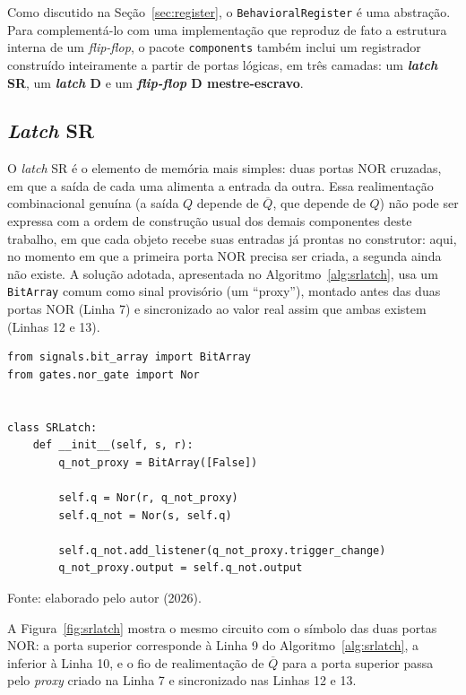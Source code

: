 Como discutido na Seção~\ref{sec:register}, o \texttt{BehavioralRegister} é uma abstração. Para complementá-lo com uma implementação que reproduz de fato a estrutura interna de um \textit{flip-flop}, o pacote \texttt{components} também inclui um registrador construído inteiramente a partir de portas lógicas, em três camadas: um \textbf{\textit{latch} SR}, um \textbf{\textit{latch} D} e um \textbf{\textit{flip-flop} D mestre-escravo}.

\subsection{\textit{Latch} SR}

O \textit{latch} SR é o elemento de memória mais simples: duas portas NOR cruzadas, em que a saída de cada uma alimenta a entrada da outra. Essa realimentação combinacional genuína (a saída $Q$ depende de $\overline{Q}$, que depende de $Q$) não pode ser expressa com a ordem de construção usual dos demais componentes deste trabalho, em que cada objeto recebe suas entradas já prontas no construtor: aqui, no momento em que a primeira porta NOR precisa ser criada, a segunda ainda não existe. A solução adotada, apresentada no Algoritmo~\ref{alg:srlatch}, usa um \texttt{BitArray} comum como sinal provisório (um ``proxy''), montado antes das duas portas NOR (Linha 7) e sincronizado ao valor real assim que ambas existem (Linhas 12 e 13).

\begin{algoritmo}[H]
\caption{SRLatch (components/sr\_latch.py).}
\label{alg:srlatch}
\begin{verbatim}
from signals.bit_array import BitArray
from gates.nor_gate import Nor


class SRLatch:
    def __init__(self, s, r):
        q_not_proxy = BitArray([False])

        self.q = Nor(r, q_not_proxy)
        self.q_not = Nor(s, self.q)

        self.q_not.add_listener(q_not_proxy.trigger_change)
        q_not_proxy.output = self.q_not.output
\end{verbatim}
\begin{center}
\footnotesize Fonte: elaborado pelo autor (2026).
\end{center}
\end{algoritmo}

A Figura~\ref{fig:srlatch} mostra o mesmo circuito com o símbolo das duas portas NOR: a porta superior corresponde à Linha 9 do Algoritmo~\ref{alg:srlatch}, a inferior à Linha 10, e o fio de realimentação de $\overline{Q}$ para a porta superior passa pelo \textit{proxy} criado na Linha 7 e sincronizado nas Linhas 12 e 13.

